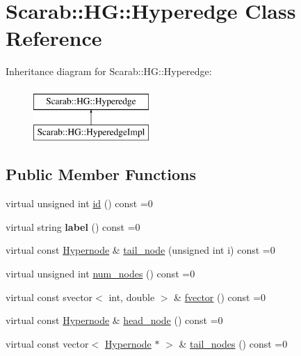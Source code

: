 \hypertarget{classScarab_1_1HG_1_1Hyperedge}{
\section{Scarab::HG::Hyperedge Class Reference}
\label{classScarab_1_1HG_1_1Hyperedge}
}
Inheritance diagram for Scarab::HG::Hyperedge:\begin{figure}[H]
\begin{center}
\leavevmode
\includegraphics[height=2cm]{classScarab_1_1HG_1_1Hyperedge}
\end{center}
\end{figure}
\subsection*{Public Member Functions}
\begin{DoxyCompactItemize}
\item 
virtual unsigned int \hyperlink{classScarab_1_1HG_1_1Hyperedge_af824beb7107253a7545b35992c17e057}{id} () const =0
\item 
\hypertarget{classScarab_1_1HG_1_1Hyperedge_a8442c017fcee87c1f865b2254b49900f}{
virtual string {\bfseries label} () const =0}
\label{classScarab_1_1HG_1_1Hyperedge_a8442c017fcee87c1f865b2254b49900f}

\item 
virtual const \hyperlink{classScarab_1_1HG_1_1Hypernode}{Hypernode} \& \hyperlink{classScarab_1_1HG_1_1Hyperedge_a9ec8cf9ea7b5f762f359a6f9f1c038da}{tail\_\-node} (unsigned int i) const =0
\item 
virtual unsigned int \hyperlink{classScarab_1_1HG_1_1Hyperedge_a799d8d98242c129d7eee178bdf1fb535}{num\_\-nodes} () const =0
\item 
virtual const svector$<$ int, double $>$ \& \hyperlink{classScarab_1_1HG_1_1Hyperedge_a0d201ddb955631aadee4c15cc8e709f8}{fvector} () const =0
\item 
virtual const \hyperlink{classScarab_1_1HG_1_1Hypernode}{Hypernode} \& \hyperlink{classScarab_1_1HG_1_1Hyperedge_a6043de341070c103d811f5286193dd46}{head\_\-node} () const =0
\item 
virtual const vector$<$ \hyperlink{classScarab_1_1HG_1_1Hypernode}{Hypernode} $\ast$ $>$ \& \hyperlink{classScarab_1_1HG_1_1Hyperedge_abac6d27691186608aa12949de6e1c283}{tail\_\-nodes} () const =0
\end{DoxyCompactItemize}


